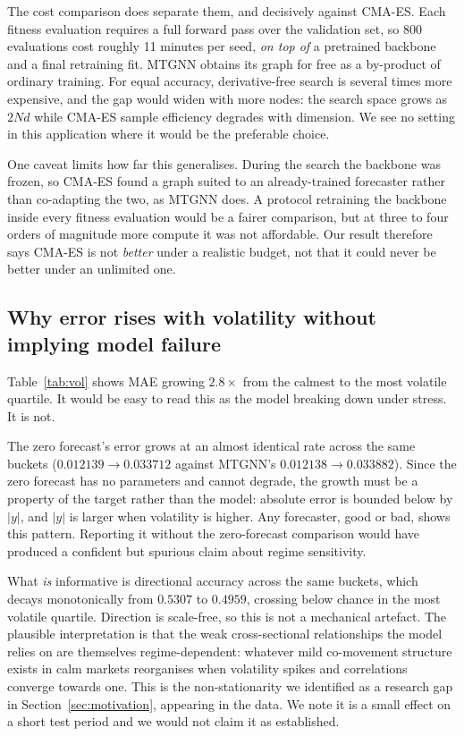 The cost comparison does separate them, and decisively against CMA-ES. Each fitness evaluation requires a full forward pass over the validation set, so 800 evaluations cost roughly 11 minutes per seed, \emph{on top of} a pretrained backbone and a final retraining fit. MTGNN obtains its graph for free as a by-product of ordinary training. For equal accuracy, derivative-free search is several times more expensive, and the gap would widen with more nodes: the search space grows as $2Nd$ while CMA-ES sample efficiency degrades with dimension. We see no setting in this application where it would be the preferable choice.

One caveat limits how far this generalises. During the search the backbone was frozen, so CMA-ES found a graph suited to an already-trained forecaster rather than co-adapting the two, as MTGNN does. A protocol retraining the backbone inside every fitness evaluation would be a fairer comparison, but at three to four orders of magnitude more compute it was not affordable. Our result therefore says CMA-ES is not \emph{better} under a realistic budget, not that it could never be better under an unlimited one.

\subsection{Why error rises with volatility without implying model failure}

Table~\ref{tab:vol} shows MAE growing $2.8\times$ from the calmest to the most volatile quartile. It would be easy to read this as the model breaking down under stress. It is not.

The zero forecast's error grows at an almost identical rate across the same buckets ($0.012139 \rightarrow 0.033712$ against MTGNN's $0.012138 \rightarrow 0.033882$). Since the zero forecast has no parameters and cannot degrade, the growth must be a property of the target rather than the model: absolute error is bounded below by $|y|$, and $|y|$ is larger when volatility is higher. Any forecaster, good or bad, shows this pattern. Reporting it without the zero-forecast comparison would have produced a confident but spurious claim about regime sensitivity.

What \emph{is} informative is directional accuracy across the same buckets, which decays monotonically from $0.5307$ to $0.4959$, crossing below chance in the most volatile quartile. Direction is scale-free, so this is not a mechanical artefact. The plausible interpretation is that the weak cross-sectional relationships the model relies on are themselves regime-dependent: whatever mild co-movement structure exists in calm markets reorganises when volatility spikes and correlations converge towards one. This is the non-stationarity we identified as a research gap in Section~\ref{sec:motivation}, appearing in the data. We note it is a small effect on a short test period and we would not claim it as established.

